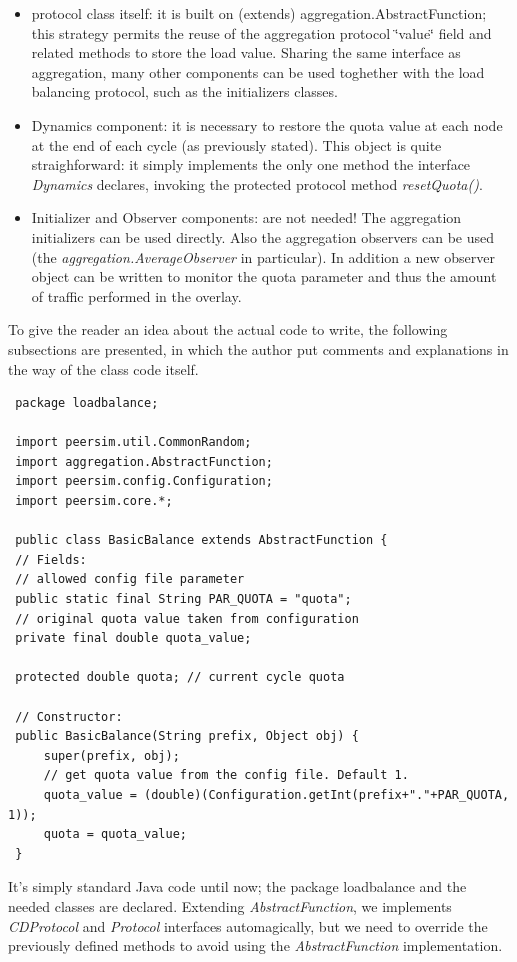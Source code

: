 \documentclass[a4paper,11pt]{article}
\begin{document}
\begin{itemize}
\item protocol class itself: it is built on (extends) aggregation.AbstractFunction;
this strategy permits the reuse of the aggregation protocol \char`\"{}value\char`\"{}
field and related methods to store the load value. Sharing the same
interface as aggregation, many other components can be used toghether
with the load balancing protocol, such as the initializers classes. 
\item Dynamics component: it is necessary to restore the quota value at
each node at the end of each cycle (as previously stated). This object
is quite straighforward: it simply implements the only one method
the interface \emph{Dynamics} declares, invoking the protected protocol
method \emph{resetQuota()}. 
\item Initializer and Observer components: are not needed!
The aggregation initializers can be used directly. Also the aggregation
observers can be used (the \emph{aggregation.AverageObserver} in particular).
In addition a new observer object can be written to monitor the quota
parameter and thus the amount of traffic performed in the overlay.
\end{itemize}
To give the reader an idea about the actual code to write, the following
subsections are presented, in which the author put comments and explanations
in the way of the class code itself.

\footnotesize
\begin{verbatim}
 package loadbalance;
 
 import peersim.util.CommonRandom;
 import aggregation.AbstractFunction;
 import peersim.config.Configuration;
 import peersim.core.*;
 
 public class BasicBalance extends AbstractFunction {
 // Fields:
 // allowed config file parameter
 public static final String PAR_QUOTA = "quota";
 // original quota value taken from configuration 
 private final double quota_value; 
 
 protected double quota; // current cycle quota
 
 // Constructor:
 public BasicBalance(String prefix, Object obj) {
     super(prefix, obj);
     // get quota value from the config file. Default 1.
     quota_value = (double)(Configuration.getInt(prefix+"."+PAR_QUOTA, 1));
     quota = quota_value;
 }
\end{verbatim}
\normalsize


It's simply standard Java code until now; the package loadbalance
and the needed classes are declared. Extending \emph{AbstractFunction},
we implements \emph{CDProtocol} and \emph{Protocol} interfaces automagically,
but we need to override the previously defined methods to avoid using
the \emph{AbstractFunction} implementation.
\end{document}
